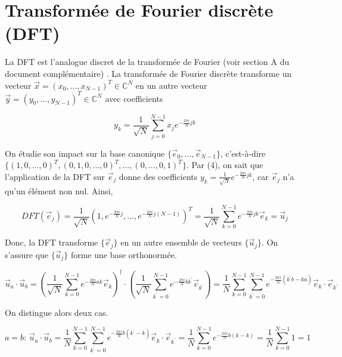 \section{Transformée de Fourier discrète (DFT)}
La DFT est l'analogue discret de la transformée de Fourier (voir section A du document complémentaire) \cite{stein2011fourier}. La transformée de Fourier discrète transforme un vecteur $\Vec{x} = (x_0 , ..., x_{N-1})^T \in \mathbb{C}^N$ en un autre vecteur $\Vec{y} = (y_0 , ..., y_{N-1})^T \in \mathbb{C}^N$ avec coefficients 

\begin{equation}
     y_k = \frac{1}{\sqrt{N}}\sum_{j=0}^{N-1}x_j e^{-\frac{2\pi i}{N}jk}
\end{equation}

On étudie son impact sur la base canonique $\{\Vec{e}_0, ..., \Vec{e}_{N-1}\}$, c'est-à-dire $\{(1, 0, ...,0)^T, (0, 1, 0, ..., 0)^T, ..., (0, ..., 0, 1)^T\}$. Par (4), on sait que l'application de la DFT sur $\Vec{e}_j$ donne des coefficients $y_k = \frac{1}{\sqrt{N}}e^{-\frac{2\pi i}{N}jk}$, car $\Vec{e}_j$ n'a qu'un élément non nul. Ainsi, 

\begin{equation*}
    DFT(\Vec{e}_j) = \frac{1}{\sqrt{N}}(1, e^{-\frac{2\pi i}{N}j}, ..., e^{-\frac{2\pi i}{N}j(N-1)})^T = \frac{1}{\sqrt{N}} \sum_{k=0}^{N-1} e^{-\frac{2\pi i}{N}jk} \Vec{e}_k = \Vec{u}_j
\end{equation*}

Donc, la DFT transforme $\{\Vec{e}_j\}$ en un autre ensemble de vecteurs $\{\Vec{u}_j\}$. On s'assure que $\{\Vec{u}_j\}$ forme une base orthonormée.

\begin{equation*}
    \Vec{u}_a \cdot \Vec{u}_b = \left(\frac{1}{\sqrt{N}}\sum_{k=0}^{N-1}e^{-\frac{2\pi i}{N}ak}\Vec{e}_k\right)^\dag \cdot \left(\frac{1}{\sqrt{N}}\sum_{k^{'} = 0}^{N-1}e^{-\frac{2\pi i}{N}b k^{'}}\Vec{e}_{k^{'}}\right) = \frac{1}{N} \sum_{k=0}^{N-1}\sum_{k^{'} = 0}^{N-1} e^{-\frac{2\pi i}{N}(k^{'}b - ka)}\Vec{e}_k \cdot \Vec{e}_{k^{'}}
\end{equation*}

On distingue alors deux cas.

\begin{equation*}
    a = b \text{: \ } \Vec{u}_a \cdot \Vec{u}_b = \frac{1}{N} \sum_{k=0}^{N-1}\sum_{k^{'} = 0}^{N-1} e^{-\frac{2\pi i}{N}b(k^{'} - k)}\Vec{e}_k \cdot \Vec{e}_{k^{'}} = \frac{1}{N}\sum_{k=0}^{N-1} e^{-\frac{2\pi i}{N}b (k - k)} = \frac{1}{N}\sum_{k=0}^{N-1}1 = 1 
\end{equation*}

